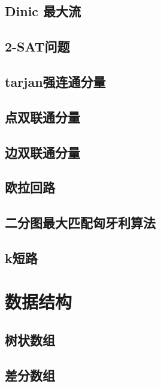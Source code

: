 \section{Dinic 最大流}
\raggedbottom
\hrulefill
\section{2-SAT问题}
\raggedbottom
\hrulefill
\section{tarjan强连通分量}
\raggedbottom
\hrulefill
\section{点双联通分量}
\raggedbottom
\hrulefill
\section{边双联通分量}
\raggedbottom
\hrulefill
\section{欧拉回路}
\raggedbottom
\hrulefill
\section{二分图最大匹配匈牙利算法}
\raggedbottom
\hrulefill
\section{k短路}
\raggedbottom
\hrulefill

\chapter{数据结构}
\section{树状数组}
\raggedbottom
\hrulefill
\section{差分数组}
\raggedbottom
\hrulefill
